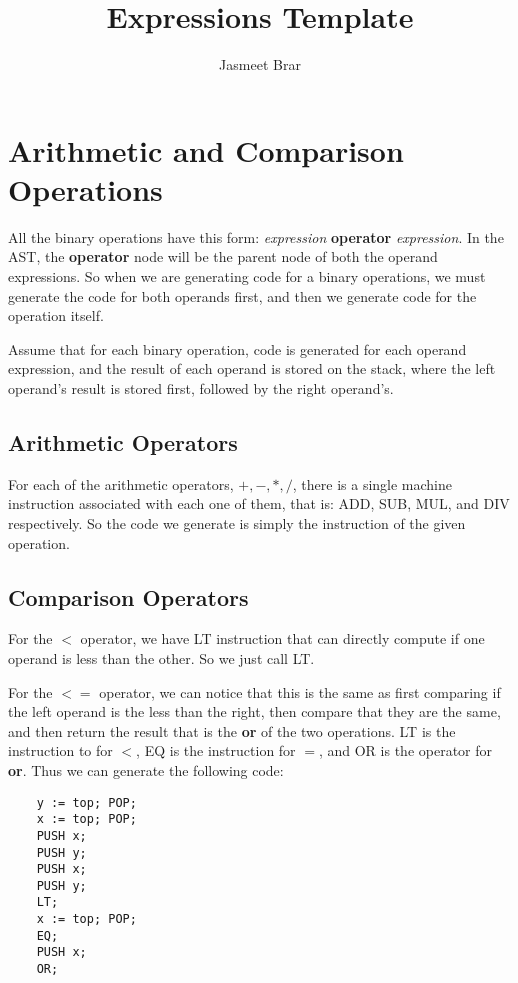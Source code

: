 \documentclass{article}
\begin{document}
	\title{Expressions Template}
	\author{Jasmeet Brar}
    \maketitle


\section{Arithmetic and Comparison Operations}

All the binary operations have this form: \textit{expression} \textbf{operator} \textit{expression}. In the AST, the \textbf{operator} node will be the parent node of both the operand expressions. So when we are generating code for a binary operations, we must generate the code for both operands first, and then we generate code for the operation itself.

Assume that for each binary operation, code is generated for each operand expression, and the result of each operand is stored on the stack, where the left operand's result is stored first, followed by the right operand's.

\subsection{Arithmetic Operators}

For each of the arithmetic operators, $+,-,*,/$, there is a single machine instruction associated with each one of them, that is: ADD, SUB, MUL, and DIV respectively. So the code we generate is simply the instruction of the given operation.

\subsection{Comparison Operators}

For the $<$ operator, we have LT instruction that can directly compute if one operand is less than the other. So we just call LT.

For the $<=$ operator, we can notice that this is the same as first comparing if the left operand is the less than the right, then compare that they are the same, and then return the result that is the \textbf{or} of the two operations. LT is the instruction to for $<$, EQ is the instruction for $=$, and OR is the operator for \textbf{or}. Thus we can generate the following code:

\begin{lstlisting}
    y := top; POP;
    x := top; POP;
    PUSH x;
    PUSH y;
    PUSH x;
    PUSH y;
    LT;
    x := top; POP;
    EQ;
    PUSH x;
    OR;
\end{lstlisting}
\end{document}
